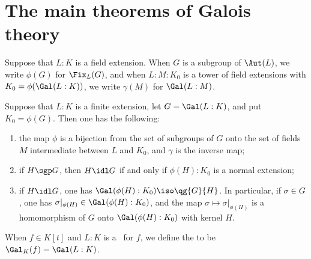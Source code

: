 \documentclass{article}
\begin{document}
\section{The main theorems of Galois theory}
  \begin{tdefinition}
    Suppose that $ L:K $ is a field extension.
    When $ G $ is a subgroup of $ \Aut(L) $, we write $ \phi(G) $ for $ \Fix_L(G) $, and when $ L:M:K_0 $ is a tower of field extensions with $ K_0=\phi(\Gal(L:K)) $, we write $ \gamma(M) $ for $ \Gal(L:M) $.
  \end{tdefinition}

  \begin{ttheorem}
    Suppose that $ L:K $ is a finite extension, let $ G=\Gal(L:K) $, and put $ K_0=\phi(G) $.
    Then one has the following: \begin{enumerate}[label=(\alph*)]
      \item the map $ \phi $ is a bijection from the set of subgroups of $ G $ onto the set of fields $ M $ intermediate between $ L $ and $ K_0 $, and $ \gamma $ is the inverse map;
      \item if $ H \sgp G $, then $ H\idl G $ if and only if $ \phi(H):K_0 $ is a normal extension;
      \item if $ H\idl G $, one has $ \Gal(\phi(H):K_0) \iso \qg{G}{H} $.
        In particular, if $ \sigma\in G $, one has $ \sigma|_{\phi(H)} \in \Gal(\phi(H):K_0) $, and the map $ \sigma\mapsto\sigma|_{\phi(H)} $ is a homomorphism of $ G $ onto $ \Gal(\phi(H):K_0) $ with kernel $ H $.
    \end{enumerate}
  \end{ttheorem}

  \begin{tdefinition}
    When $ f\in K[t] $ and $ L:K $ is a \sfe~for $ f $, we define the  to be $ \Gal_K(f) = \Gal(L:K) $.
  \end{tdefinition}

\end{document}
